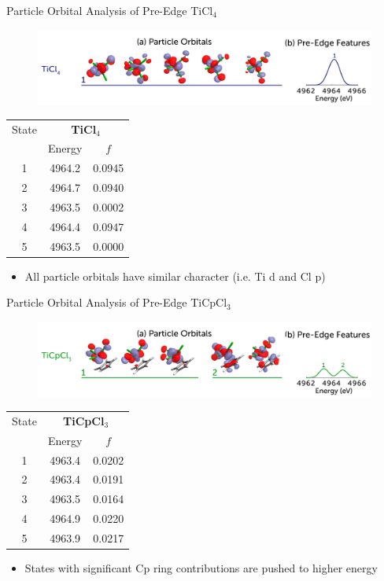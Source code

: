 \documentclass[t]{beamer}
\begin{document}
\begin{frame}{Particle Orbital Analysis of Pre-Edge TiCl$_4$}
 \begin{figure}
\includegraphics[scale=0.15]{ticl4_preedge.png}
\end{figure}
\begin{table}
\footnotesize
\begin{tabular}{c@{\hskip 1in}c@{\hskip 1in}c}
\toprule
State &   \multicolumn{2}{c}{\textbf{TiCl$_4$}}   \\
& Energy & $f$ \\
\cmidrule(r){2-3}
1 & 4964.2 & 0.0945\\
2 & 4964.7 & 0.0940\\
3 & 4963.5 & 0.0002\\
4 & 4964.4 & 0.0947\\
5 & 4963.5 & 0.0000\\
\bottomrule
\end{tabular}
\end{table}
\begin{itemize}
\item All particle orbitals have similar character (i.e. Ti d and Cl p)
\end{itemize}
\end{frame}

\begin{frame}{Particle Orbital Analysis of Pre-Edge TiCpCl$_3$}
 \begin{figure}
\includegraphics[scale=0.15]{ticpcl3_preedge.png}
\end{figure}
\begin{table}
\footnotesize
\begin{tabular}{c@{\hskip 1in}c@{\hskip 1in}c}
\toprule
State &   \multicolumn{2}{c}{\textbf{TiCpCl$_3$}}   \\
& Energy & $f$ \\
\cmidrule(r){2-3}
1 & 4963.4 & 0.0202\\
2 & 4963.4 & 0.0191\\
3 & 4963.5 & 0.0164\\
4 & 4964.9 & 0.0220\\
5 & 4963.9 & 0.0217\\
\bottomrule
\end{tabular}
\end{table}
\begin{itemize}
\item States with significant Cp ring contributions are pushed to higher energy
\end{itemize}
\end{frame}
\end{document}
